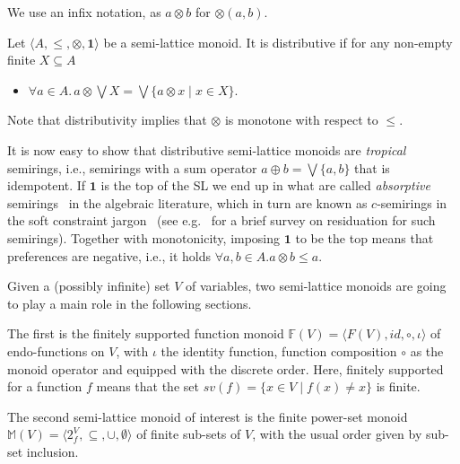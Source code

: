 \documentclass{llncs}
\def\monid{{\mathbf 0}}
\def\monop{\otimes}
\def\odiv{\, {\ominus\hspace{-7.7pt} \div} \,}
\def\monid{\mathbf{1}}
\begin{document}
We use an infix notation, as $a \monop b$ for $\monop(a,b)$.

\begin{definition}[Distributivity]
\label{dist}
Let $\langle A, \leq, \monop, \monid \rangle$ be a semi-lattice monoid.
It is distributive if
	for  any  non-empty finite  $X \subseteq A$
	\begin{itemize}
		\item $\forall a \in A.\,  a \monop  \bigvee X = \bigvee \{a \monop x \mid x \in X\}$.
	\end{itemize}

\end{definition}

Note that distributivity implies that $\otimes$ is monotone with respect to $\leq$.
\begin{remark}

	It is now easy to show that distributive semi-lattice monoids are \emph{tropical} semirings, i.e., semirings with a sum operator
	$a \oplus b = \bigvee \{a, b\}$ that is idempotent.
	If $\monid$ is the top of the SL we end up 
	in what are called \emph{absorptive} semirings~\cite{golan} 
	in the algebraic literature, which in turn are known as $c$-semirings 
	in the soft constraint jargon~\cite{jacm97} (see e.g.~\cite{ecai06} for a brief survey on residuation 
	for such semirings).
	Together with monotonicity, imposing $\monid$ to be the top means that preferences are negative, i.e., 
	it holds $\forall a, b \in A. a \monop b \leq a$.
\end{remark}

\begin{example}
Given a (possibly infinite) set $V$ of variables, two semi-lattice monoids are going to play a main role in the following sections.

The first is the finitely supported function monoid $\mathbb{F}(V) = \langle F(V), id, \circ, \iota \rangle$ of endo-functions on $V$, 
with $\iota$  the identity function, function composition $\circ$ as the monoid operator and equipped with the discrete order.
Here, finitely supported for a function $f$ means that the set 
$sv(f) = \{ x \in V \mid f(x)\neq x \}$ is finite.

The second semi-lattice monoid of interest is the finite power-set monoid
$\mathbb{M}(V) = \langle 2_f^V, \subseteq, \cup, \emptyset \rangle$
of finite sub-sets of $V$, with the usual order given by sub-set inclusion.
\end{example}
\end{document}
